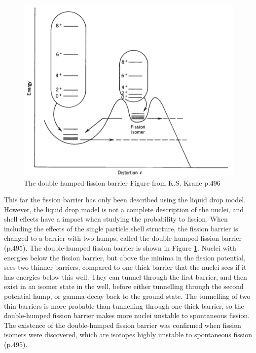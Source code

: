 \documentclass[]{article}
\begin{document}
  \begin{figure} [tbp]
	\centering
	\includegraphics[scale=0.7]{double_humped_fission_barrier.png}
	\caption{The double humped fission barrier Figure from K.S. Krane p.496 \cite{Krane1988}}
	\label{fig:double_humped_fission_barrier}
\end{figure}

\par
\vspace{3mm}

\noindent This far  the fission barrier has only been described using the liquid drop model. However, the liquid drop model is not a complete description of the nuclei, and shell effects have a impact when studying the probability to fission. When including the effects of the single particle shell structure, the fission barrier is changed to a barrier with two humps, called the double-humped fission barrier \cite{Krane1988} (p.495). The double-humped fission barrier is shown in Figure \ref{fig:double_humped_fission_barrier}. Nuclei with energies below the fission barrier, but above the minima in the fission potential, sees two thinner barriers, compared to one thick barrier that the nuclei sees if it has energies below this well. They can tunnel through the first barrier, and then exist in an isomer state in the well, before either tunnelling through the second potential hump, or gamma-decay back to the ground state.  The tunnelling of two thin barriers is more probable than tunnelling through one thick barrier, so the double-humped fission barrier makes more nuclei unstable to spontaneous fission. The existence of the double-humped fission barrier was confirmed when fission isomers were discovered, which are isotopes highly unstable to spontaneous fission \cite{Krane1988} (p.495). 
\end{document}
